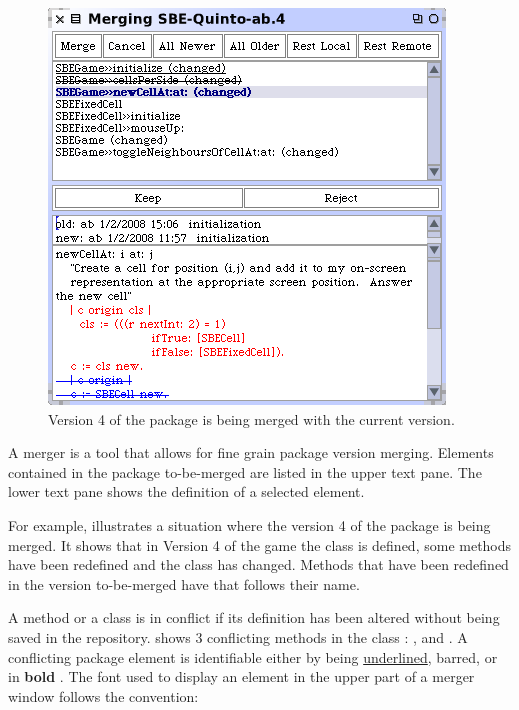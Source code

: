 \documentclass[a4paper,10pt,twoside]{book}
\begin{document}
\begin{figure}[ht]\centering
	\includegraphics[width=.75\linewidth]{merger}
	\caption{Version 4 of the package  is being merged with the current version.
	}
\end{figure}

A merger is a tool that allows for fine grain package version merging. Elements contained in the package to-be-merged are listed in the upper text pane. The lower text pane shows the definition of a selected element. 

For example,  illustrates a situation where the version 4 of the  package is being merged. It shows that in Version 4 of the game the class  is defined, some methods have been redefined and the class  has changed. Methods that have been redefined in the version to-be-merged have  that follows their name.

A method or a class is in conflict if its definition has been altered without being saved in the repository.  shows 3 conflicting methods in the class : ,  and . A conflicting package element is identifiable either by being \underline{underlined}, barred, or in {\bf bold} . The font used to display an element in the upper part of a merger window follows the convention:
\end{document}
